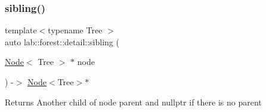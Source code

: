 \subsubsection{\texorpdfstring{sibling()}{sibling()}}
{\footnotesize\ttfamily template$<$typename Tree $>$ \\
auto lab\+::forest\+::detail\+::sibling (\begin{DoxyParamCaption}\item[{\hyperlink{structlab_1_1forest_1_1detail_1_1Node}{Node}$<$ Tree $>$ $\ast$}]{node }\end{DoxyParamCaption}) -\/$>$ \hyperlink{structlab_1_1forest_1_1detail_1_1Node}{Node}$<$Tree$>$$\ast$ }

\begin{DoxyReturn}{Returns}
Another child of node parent and nullptr if there is no parent 
\end{DoxyReturn}
